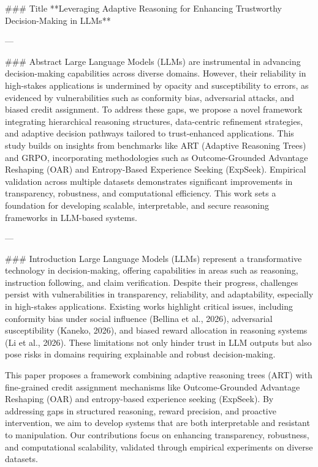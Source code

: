 ### Title  
**Leveraging Adaptive Reasoning for Enhancing Trustworthy Decision-Making in LLMs**

---

### Abstract  
Large Language Models (LLMs) are instrumental in advancing decision-making capabilities across diverse domains. However, their reliability in high-stakes applications is undermined by opacity and susceptibility to errors, as evidenced by vulnerabilities such as conformity bias, adversarial attacks, and biased credit assignment. To address these gaps, we propose a novel framework integrating hierarchical reasoning structures, data-centric refinement strategies, and adaptive decision pathways tailored to trust-enhanced applications. This study builds on insights from benchmarks like ART (Adaptive Reasoning Trees) and GRPO, incorporating methodologies such as Outcome-Grounded Advantage Reshaping (OAR) and Entropy-Based Experience Seeking (ExpSeek). Empirical validation across multiple datasets demonstrates significant improvements in transparency, robustness, and computational efficiency. This work sets a foundation for developing scalable, interpretable, and secure reasoning frameworks in LLM-based systems.

---

### Introduction  
Large Language Models (LLMs) represent a transformative technology in decision-making, offering capabilities in areas such as reasoning, instruction following, and claim verification. Despite their progress, challenges persist with vulnerabilities in transparency, reliability, and adaptability, especially in high-stakes applications. Existing works highlight critical issues, including conformity bias under social influence (Bellina et al., 2026), adversarial susceptibility (Kaneko, 2026), and biased reward allocation in reasoning systems (Li et al., 2026). These limitations not only hinder trust in LLM outputs but also pose risks in domains requiring explainable and robust decision-making.

This paper proposes a framework combining adaptive reasoning trees (ART) with fine-grained credit assignment mechanisms like Outcome-Grounded Advantage Reshaping (OAR) and entropy-based experience seeking (ExpSeek). By addressing gaps in structured reasoning, reward precision, and proactive intervention, we aim to develop systems that are both interpretable and resistant to manipulation. Our contributions focus on enhancing transparency, robustness, and computational scalability, validated through empirical experiments on diverse datasets.


